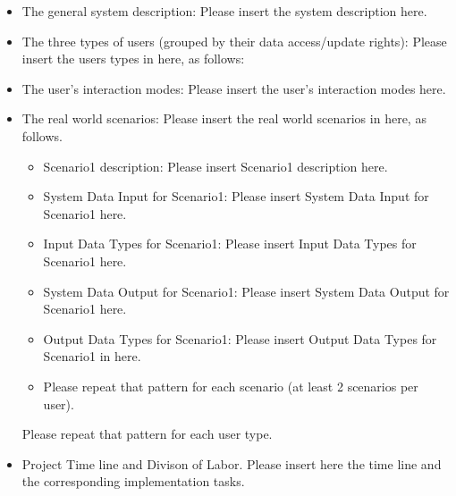 \begin{itemize} 
\item{The general system description: } 
Please insert the system description here.
\item{The three types of users (grouped by their data access/update rights): }
Please insert the users types in here, as follows:
\item{The user's interaction modes: }
Please insert the user's interaction modes here.
\item{The real world scenarios: }
Please insert the real world scenarios in here, as follows.
	\begin{itemize} 
	\item{Scenario1 description: }
	Please insert Scenario1 description here.
	\item{System Data Input for Scenario1: }
	Please insert System Data Input for Scenario1 here.
	\item{Input Data Types for Scenario1: }
	Please insert Input Data Types for Scenario1 here.
	\item{System Data Output for Scenario1: }
	Please insert System Data Output for Scenario1 here.
	\item{Output Data Types for Scenario1: }
	Please insert Output Data Types for Scenario1 in here.
	\item {Please repeat that pattern for each scenario (at least 2 scenarios per user).}
	\end{itemize}
Please repeat that pattern for each user type.
\item{Project Time line and Divison of Labor.}
Please insert here the time line and the corresponding implementation tasks.
\end{itemize}
